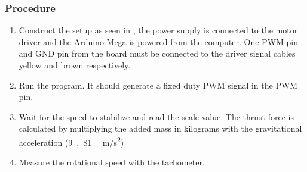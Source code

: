 \subsubsection{Procedure}
\begin{enumerate}
	\item Construct the setup as seen in , the power supply is connected to the motor driver and the Arduino Mega is powered from the computer. One PWM pin and GND pin from the board must be connected to the driver signal cables yellow and brown respectively. 
	\item Run the program. It should generate a fixed duty PWM signal in the PWM pin.
	\item Wait for the speed to stabilize and read the scale value. The thrust force is calculated by multiplying the added mass in kilograms with the gravitational acceleration (\si{9,81\textbf{ }m/s^2})
	\item Measure the rotational speed with the tachometer.
\end{enumerate}


